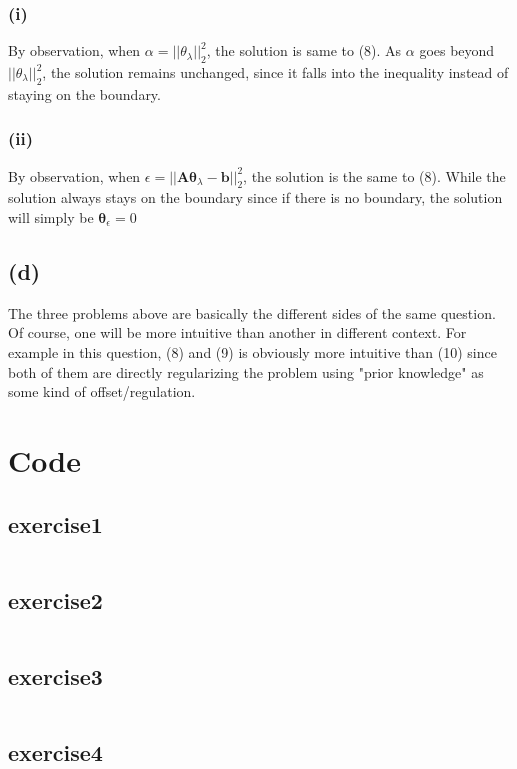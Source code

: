 \documentclass[11pt]{article}
\begin{document}
\subsubsection*{(i)}
\begin{figure}[h]
	\centering
\end{figure}
\noindent By observation, when $\alpha = ||\theta_\lambda||^2_2$, the solution is same to (8). As $\alpha$ goes beyond $||\theta_\lambda||^2_2$, the solution remains unchanged, since it falls into the inequality instead of staying on the boundary. 
\pagebreak

\subsubsection*{(ii)}
\begin{figure}[h]
	\centering
\end{figure}
\noindent By observation, when $\epsilon = ||\pmb{A\theta}_\lambda-\pmb{b}||^2_2$, the solution is the same to (8). While the solution always stays on the boundary since if there is no boundary, the solution will simply be $\pmb{\theta}_\epsilon = 0$
\subsection*{(d)}
The three problems above are basically the different sides of the same question. Of course, one will be more intuitive than another in different context. For example in this question, (8) and (9) is obviously more intuitive than (10) since both of them are directly regularizing the problem using "prior knowledge" as some kind of offset/regulation. 
\pagebreak
\section*{Code}
\subsection*{exercise1}
\inputminted[breaklines]{python}{py/exercise1.py}
\subsection*{exercise2}
\inputminted[breaklines]{python}{py/exercise2.py}
\subsection*{exercise3}
\inputminted[breaklines]{python}{py/exercise3.py}
\subsection*{exercise4}
\inputminted[breaklines]{python}{py/exercise4.py}
\end{document}
